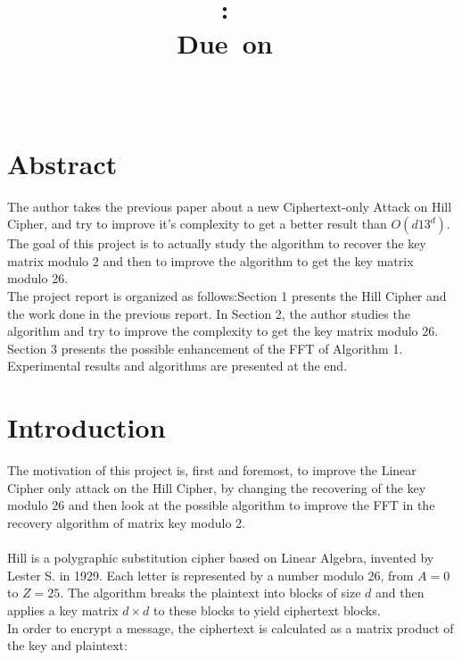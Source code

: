 \documentclass{article}
\title{
\logoepfl
\vspace{2in}
\textmd{\textbf{\hmwkClass:\ \hmwkTitle}}\\
\normalsize\vspace{0.1in}\small{Due\ on\ \hmwkDueDate}\\
\vspace{0.1in}\large{\textit{\hmwkClassInstructor\ \hmwkClassTime}}
\author{\textbf{\hmwkAuthorName}}
\vspace{3in}
\logolasec
}
\begin{document}
\maketitle

\newpage
\section*{Abstract}
The author takes the previous paper about a new Ciphertext-only Attack on Hill Cipher, and try to improve it's complexity to get a better result than $O(d13^d)$.\\
${}$\hspace{1em}The goal of this project is to actually study the algorithm to recover the key matrix modulo 2 and then to improve the algorithm to get the key matrix modulo 26.\\
${}$\hspace{1em}The project report is organized as follows:Section 1 presents the Hill Cipher and the work done in the previous report. In Section 2, the author studies the algorithm and try to improve the complexity to get the key matrix modulo 26. Section 3 presents the possible enhancement of the FFT of Algorithm 1. Experimental results and algorithms are presented at the end.

\newpage
\tableofcontents
\newpage



\section{Introduction}
The motivation of this project is, first and foremost, to improve the Linear Cipher only attack on the Hill Cipher, by changing the recovering of the key modulo 26 and then look at the possible algorithm to improve the FFT in the recovery algorithm of matrix key modulo 2.\\
\\
Hill is a polygraphic substitution cipher based on Linear Algebra, invented by Lester S. in 1929. Each letter is represented by a number modulo 26, from $A=0$ to $Z=25$. The algorithm breaks the plaintext into blocks of size $d$ and then applies a key matrix $d \times d $ to these blocks to yield ciphertext blocks.\\
In order to encrypt a message, the ciphertext is calculated as a matrix product of the key and plaintext:
\end{document}
